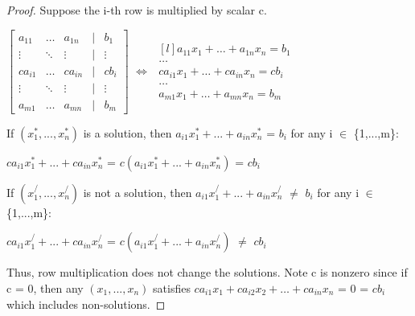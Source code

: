     \begin{proof}
        Suppose the i-th row is multiplied by scalar c.

        \hspace{0.5cm}
        \footnotesize
        $\begin{bmatrix}
            a_{11} & \hdots & a_{1n} & | & b_1 \\
            \vdots & \ddots & \vdots & | & \vdots \\
            ca_{i1} & \hdots & ca_{in} & | & cb_i \\
            \vdots & \ddots & \vdots & | & \vdots \\
            a_{m1} & \hdots & a_{mn} & | & b_m
        \end{bmatrix}$
        \hspace{0.5cm}
        $\Leftrightarrow$
        \hspace{0.5cm}
        $\begin{matrix*}[l]
            a_{11}x_1 + \hdots + a_{1n}x_n = b_1 \\
            \hdots \\
            ca_{i1}x_1 + \hdots + ca_{in}x_n = cb_i \\
            \hdots \\
            a_{m1}x_1 + \hdots + a_{mn}x_n = b_m
        \end{matrix*}$
        \normalsize

        \hspace{0.5cm}
        If $(x_1^*,...,x_n^*)$ is a solution,
        then $a_{i1}x_1^* + ... + a_{in}x_n^*$ = $b_i$
        for any i $\in$ \{1,...,m\}:

        \hspace{1cm}
        $ca_{i1}x_1^* + ... + ca_{in}x_n^*$
        = $c(a_{i1}x_1^* + ... + a_{in}x_n^*)$
        = $cb_i$
        
        \hspace{0.5cm}
        If $(x_1^/,...,x_n^/)$ is not a solution,
        then $a_{i1}x_1^/ + ... + a_{in}x_n^/$ $\not =$ $b_i$
        for any i $\in$ \{1,...,m\}:
        
        \hspace{1cm}
        $ca_{i1}x_1^/ + ... + ca_{in}x_n^/$
        = $c(a_{i1}x_1^/ + ... + a_{in}x_n^/)$
        $\not =$ $cb_i$
        

        Thus, row multiplication does not change the solutions.
        Note c is nonzero since if c = 0, then any $(x_1,...,x_n)$
        satisfies $ca_{i1}x_1 + ca_{i2}x_2 + \hdots + ca_{in}x_n$
        = 0 = $cb_i$ which includes non-solutions.


\end{proof}
